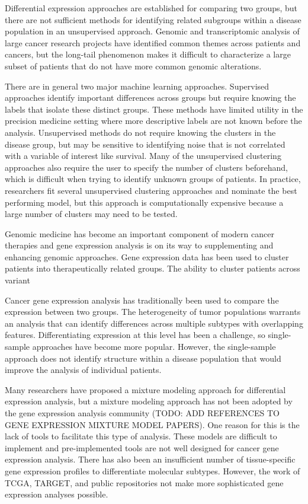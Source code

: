 \documentclass[fleqn,10pt]{wlscirep}
\begin{document}
Differential expression approaches are established for comparing two groups, but there are not sufficient methods for identifying related subgroups within a disease population in an unsupervised approach. Genomic and transcriptomic analysis of large cancer research projects have identified common themes across patients and cancers, but the long-tail phenomenon makes it difficult to characterize a large subset of patients that do not have more common genomic alterations.

There are in general two major machine learning approaches. Supervised approaches identify important differences across groups but require knowing the labels that isolate these distinct groups. These methods have limited utility in the precision medicine setting where more descriptive labels are not known before the analysis. Unsupervised methods do not require knowing the clusters in the disease group, but may be sensitive to identifying noise that is not correlated with a variable of interest like survival. Many of the unsupervised clustering approaches also require the user to specify the number of clusters beforehand, which is difficult when trying to identify unknown groups of patients. In practice, researchers fit several unsupervised clustering approaches and nominate the best performing model, but this approach is computationally expensive because a large number of clusters may need to be tested. 

Genomic medicine has become an important component of modern cancer therapies and gene expression analysis is on its way to supplementing and enhancing genomic approaches. Gene expression data has been used to cluster patients into therapeutically related groups. The ability to cluster patients across variant

Cancer gene expression analysis has traditionally been used to compare the expression between two groups. The heterogeneity of tumor populations warrants an analysis that can identify differences across multiple subtypes with overlapping features. Differentiating expression at this level has been a challenge, so single-sample approaches have become more popular. However, the single-sample approach does not identify structure within a disease population that would improve the analysis of individual patients. 


Many researchers have proposed a mixture modeling approach for differential expression analysis, but a mixture modeling approach has not been adopted by the gene expression analysis community (TODO: ADD REFERENCES TO GENE EXPRESSION MIXTURE MODEL PAPERS). One reason for this is the lack of tools to facilitate this type of analysis. These models are difficult to implement and pre-implemented tools are not well designed for cancer gene expression analysis. There has also been an insufficient number of tissue-specific gene expression profiles to differentiate molecular subtypes. However, the work of TCGA, TARGET, and public repositories not make more sophisticated gene expression analyses possible. 
\end{document}
